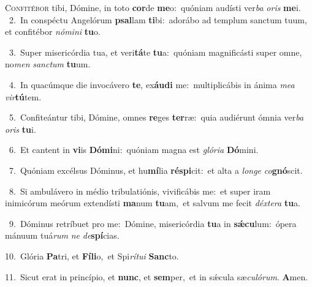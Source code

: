 \lettrine{\initial\textcolor{\initialcolor}{C}}{onfitébor} tibi, Dómine, in toto \textbf{cor}\-de \textbf{me}\-o:~\star quóniam audísti ver\textit{ba} \textit{o}\-\textit{ris} \textbf{me}\-i.\\
{\numbfont\textcolor{\numbcolor}{~2.}}~In conspéctu Angelórum \textbf{psal}\-lam \textbf{ti}\-bi:~\star adorábo ad templum sanctum tuum, et confitébor \textit{nó}\-\textit{mi}\textit{ni} \textbf{tu}\-o.\par
{\numbfont\textcolor{\numbcolor}{~3.}}~Super misericórdia tua, et veri\-\textbf{tá}\-te \textbf{tu}\-a:~\star quóniam magnificásti super omne, no\textit{men} \textit{sanc}\-\textit{tum} \textbf{tu}\-um.\par
{\numbfont\textcolor{\numbcolor}{~4.}}~In quacúmque die invocávero \textbf{te}\-, ex\-\textbf{áu}\-\textbf{di} me:~\star multiplicábis in ánima \textit{me}\-\textit{a} \textit{vir}\-\textbf{tú}tem.\par
{\numbfont\textcolor{\numbcolor}{~5.}}~Confiteántur tibi, Dómine, omnes \textbf{re}\-ges \textbf{ter}\-ræ:~\star quia audiérunt ómnia ver\textit{ba} \textit{o}\-\textit{ris} \textbf{tu}\-i.\par
{\numbfont\textcolor{\numbcolor}{~6.}}~Et cantent in \textbf{vi}\-is \textbf{Dó}\-\textbf{mi}ni:~\star quóniam magna est \textit{gló}\-\textit{ri}\textit{a} \textbf{Dó}\-mini.\par
{\numbfont\textcolor{\numbcolor}{~7.}}~Quóniam excélsus Dóminus, et hu\-\textbf{mí}\-lia \textbf{ré}\-\textbf{spi}cit:~\star et alta a \textit{lon}\-\textit{ge} \textit{co}\-\textbf{gnó}scit.\par
{\numbfont\textcolor{\numbcolor}{~8.}}~Si ambulávero in médio tribulatiónis, vivificábis me:~\dagger et super iram inimicórum meórum extendísti \textbf{ma}\-num \textbf{tu}\-am,~\star et salvum me fecit \textit{déx}\-\textit{te}\textit{ra} \textbf{tu}\-a.\par
{\numbfont\textcolor{\numbcolor}{~9.}}~Dóminus retríbuet pro me:~\dagger Dómine, misericórdia \textbf{tu}\-a in \textbf{sǽ}\-\textbf{cu}lum:~\star ópera mánuum tuá\textit{rum} \textit{ne} \textit{de}\-\textbf{spí}cias.\par
{\numbfont\textcolor{\numbcolor}{10.}}~Glória \textbf{Pa}\-tri, et \textbf{Fí}\-\textbf{li}o,~\star et Spi\-\textit{rí}\-\textit{tu}\textit{i} \textbf{Sanc}\-to.\par
{\numbfont\textcolor{\numbcolor}{11.}}~Sicut erat in princípio, et \textbf{nunc}\-, et \textbf{sem}\-per,~\star et in sǽcula sæ\-\textit{cu}\-\textit{ló}\textit{rum}. \textbf{A}\-men.\par
